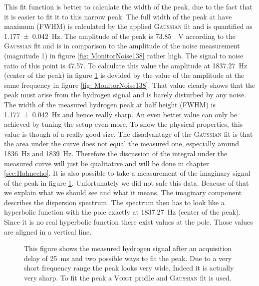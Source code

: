 This fit function is better to calculate the width of the peak, due to the fact that it is easier to fit it to this narrow peak.
The full width of the peak at have maximum (FWHM) is calculated by the applied \textsc{Gaussian} fit and is quantified as \SI{1.177 \pm 0.042}{\hertz}. \newline
The amplitude of the peak is \SI{73.85}{\mu \volt} according to the \textsc{Gaussian} fit and is in comparison to the amplitude of the noise measurement (magnitude \SI{1}{}) in figure \ref{fig: MonitorNoise138} rather high.
The signal to noise ratio of this point is \SI{47.57}{}.
To calculate this value the amplitude at \SI{1837.27}{\hertz} (center of the peak) in figure \ref{fig:Pulsandcollect138_delay_25_gauss} is devided by the value of the amplitude at the same frequency in figure \ref{fig: MonitorNoise138}.
That value clearly shows that the peak must arise from the hydrogen signal and is barely disturbed by any noise.\newline
The width of the measured hydrogen peak at half height (FWHM) is \SI{1.177 \pm 0.042}{\hertz} and hence really sharp.
An even better value can only be achieved by tuning the setup even more.
To show the physical properties, this value is though of a really good size.\newline
The disadvantage of the \textsc{Gaussian} fit is that the area under the curve does not equal the measured one, especially around \SI{1836}{\hertz} and \SI{1839}{\hertz}.
Therefore the discussion of the integral under the measured curve will just be qualitative and will be done in chapter \ref{sec:Hahnecho}.\newline
It is also possible to take a measurement of the imaginary signal of the peak in figure \ref{fig:Pulsandcollect138_delay_25_gauss}.
Unfortunately we did not safe this data.
Beacuse of that we explain what we should see and what it means.
The imaginary component describes the dispersion spectrum.
The spectrum then has to look like a hyperbolic function with the pole exactly at \SI{1837.27}{\hertz} (center of the peak).
Since it is no real hyperbolic function there exist values at the pole.
Those values are aligned in a vertical line.
\begin{figure}[H]
    \centering
    
    \caption[This figure shows the measured hydrogen signal after an acquisition delay of \SI{25}{\milli \second} and two possible ways to fit the peak.]{This figure shows the measured hydrogen signal after an acquisition delay of \SI{25}{\milli \second} and two possible ways to fit the peak.
    Due to a very short frequency range the peak looks very wide. Indeed it is actually very sharp.
    To fit the peak a \textsc{Voigt} profile and \textsc{Gaussian} fit is used.}
    \label{fig:Pulsandcollect138_delay_25_gauss}
\end{figure}